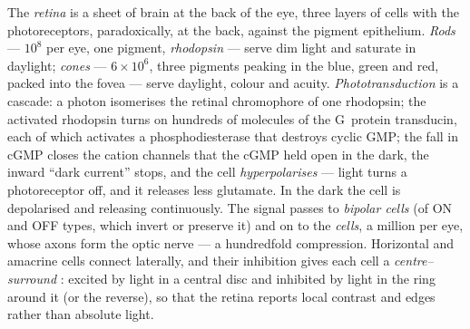 \begin{definition}\label{def:b3:sensory-systems:retina}
The \emph{retina} is a sheet of brain at the back of the eye, three
layers of cells with the photoreceptors, paradoxically, at the back,
against the pigment epithelium. \emph{Rods} --- $10^{8}$ per eye, one
pigment, \emph{rhodopsin} --- serve dim light and saturate in daylight;
\emph{cones} --- $6\times 10^{6}$, three pigments peaking in the blue,
green and red, packed into the fovea --- serve daylight, colour and
acuity. \emph{Phototransduction} is a cascade: a photon isomerises the
retinal chromophore of one rhodopsin; the activated rhodopsin turns on
hundreds of molecules of the G~protein transducin, each of which
activates a phosphodiesterase that destroys cyclic GMP; the fall in
cGMP closes the cation channels that the cGMP held open in the dark,
the inward ``dark current'' stops, and the cell \emph{hyperpolarises} ---
light turns a photoreceptor off, and it releases less glutamate. In the
dark the cell is depolarised and releasing continuously. The signal
passes to \emph{bipolar cells} (of ON and OFF types, which invert or
preserve it) and on to the \emph{ cells}, a million per eye,
whose axons form the optic nerve --- a hundredfold compression.
Horizontal and amacrine cells connect laterally, and their inhibition
gives each  cell a \emph{centre--surround} :
excited by light in a central disc and inhibited by light in the ring
around it (or the reverse), so that the retina reports local contrast
and edges rather than absolute light.
\end{definition}

